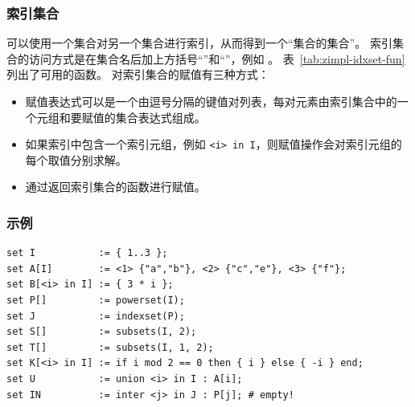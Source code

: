 \subsubsection{索引集合}%
\label{sec:indexed-sets}
可以使用一个集合对另一个集合进行索引，从而得到一个“集合的集合”。
索引集合的访问方式是在集合名后加上方括号“\code{[}”和“\code{]}”，例如 。
表~\ref{tab:zimpl-idxset-fun} 列出了可用的函数。  
对索引集合的赋值有三种方式：  
\begin{itemize}
\setlength{\itemsep}{0pt}%
\item 赋值表达式可以是一个由逗号分隔的键值对列表，每对元素由索引集合中的一个元组和要赋值的集合表达式组成。  
\item 如果索引中包含一个索引元组，例如 \verb|<i> in I|，则赋值操作会对索引元组的每个取值分别求解。  
\item 通过返回索引集合的函数进行赋值。  
\end{itemize}

\subsubsection{示例}
{\small
\begin{verbatim}
set I           := { 1..3 };
set A[I]        := <1> {"a","b"}, <2> {"c","e"}, <3> {"f"};
set B[<i> in I] := { 3 * i };
set P[]         := powerset(I);
set J           := indexset(P);
set S[]         := subsets(I, 2);
set T[]         := subsets(I, 1, 2);
set K[<i> in I] := if i mod 2 == 0 then { i } else { -i } end;
set U           := union <i> in I : A[i];
set IN          := inter <j> in J : P[j]; # empty!
\end{verbatim}
}

